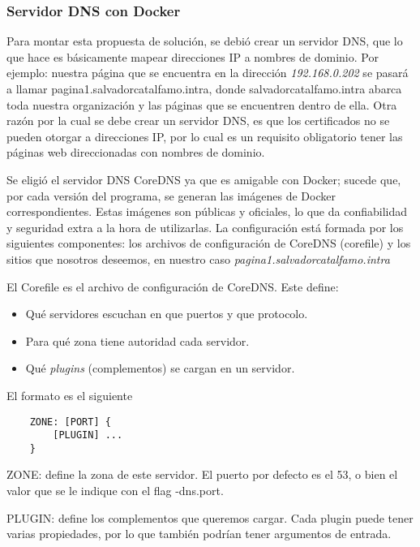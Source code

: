 \subsubsection*{Servidor DNS con Docker}

Para montar esta propuesta de solución, se debió crear un servidor DNS, que lo que hace
es básicamente mapear direcciones IP a nombres de dominio. Por ejemplo: nuestra página que 
se encuentra en la dirección \textit{192.168.0.202} se pasará a llamar pagina1.salvadorcatalfamo.intra, 
donde salvadorcatalfamo.intra abarca toda nuestra organización y las páginas que se encuentren
dentro de ella. Otra razón por la cual se debe 
crear un servidor DNS, es que los certificados no se pueden otorgar a direcciones IP, por lo 
cual es un requisito obligatorio tener las páginas web direccionadas con nombres de dominio.

Se eligió el servidor DNS CoreDNS ya que es amigable con Docker; sucede que, por cada versión del 
programa, se generan las imágenes de Docker correspondientes. Estas imágenes son públicas y oficiales, 
lo que da confiabilidad y seguridad extra a la hora de utilizarlas. La configuración está formada por 
los siguientes componentes: los archivos de configuración de CoreDNS (corefile) y los sitios que 
nosotros deseemos, en nuestro caso \textit{pagina1.salvadorcatalfamo.intra}

\noindent El Corefile es el archivo de configuración de CoreDNS. Este define:
\begin{itemize}
    \setlength\itemsep{-0.6em}
    \item Qué servidores escuchan en que puertos y que protocolo.
    \item Para qué zona tiene autoridad cada servidor.
    \item Qué \emph{plugins} (complementos) se cargan en un servidor.
\end{itemize}

\noindent El formato es el siguiente
\begin{verbatim}
    ZONE: [PORT] {
        [PLUGIN] ...
    }
\end{verbatim}

\noindent ZONE: define la zona de este servidor. El puerto por defecto es el \textsf{53}, o bien el valor que se le indique 
con el flag \textsf{-dns.port}.

\noindent PLUGIN: define los complementos que queremos cargar. Cada plugin puede tener varias propiedades, por 
lo que también podrían tener argumentos de entrada.


